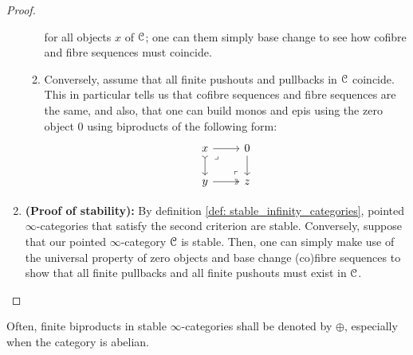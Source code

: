 \begin{proof}
\begin{enumerate}
\begin{enumerate}
$$                                        $$
                                    for all objects $x$ of $\mathcal{C}$; one can them simply base change to see how cofibre and fibre sequences must coincide.
                                    \item Conversely, assume that all finite pushouts and pullbacks in $\mathcal{C}$ coincide. This in particular tells us that cofibre sequences and fibre sequences are the same, and also, that one can build monos and epis using the zero object $0$ using biproducts of the following form:
                                        $$
                                            \begin{tikzcd}
                                            	x & 0 \\
                                            	y & z
                                            	\arrow[from=1-2, to=2-2]
                                            	\arrow[two heads, from=2-1, to=2-2]
                                            	\arrow[tail, from=1-1, to=2-1]
                                            	\arrow[from=1-1, to=1-2]
                                            	\arrow["\lrcorner"{anchor=center, pos=0.125}, draw=none, from=1-1, to=2-2]
                                            	\arrow["\lrcorner"{anchor=center, pos=0.125, rotate=180}, draw=none, from=2-2, to=1-1]
                                            \end{tikzcd}
                                        $$
                                \end{enumerate}
                            \item \textbf{(Proof of stability):} By definition \ref{def: stable_infinity_categories}, pointed $\infty$-categories that satisfy the second criterion are stable. Conversely, suppose that our pointed $\infty$-category $\mathcal{C}$ is stable. Then, one can simply make use of the universal property of zero objects and base change (co)fibre sequences to show that all finite pullbacks and all finite pushouts must exist in $\mathcal{C}$. 
                        \end{enumerate}
                    \end{proof}
                \begin{convention}
                    Often, finite biproducts in stable $\infty$-categories shall be denoted by $\oplus$, especially when the category is abelian.
                \end{convention}  
                
